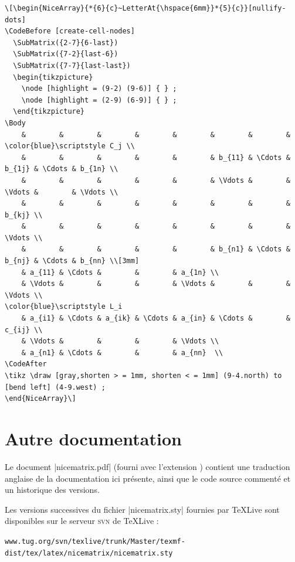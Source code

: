 \documentclass[dvipsnames]{article}%
\begin{document}
\begin{Verbatim}[formatcom = \small\color{gray}]
\[\begin{NiceArray}{*{6}{c}~LetterAt{\hspace{6mm}}*{5}{c}}[nullify-dots]
\CodeBefore [create-cell-nodes]
  \SubMatrix({2-7}{6-last})
  \SubMatrix({7-2}{last-6})
  \SubMatrix({7-7}{last-last})
  \begin{tikzpicture}
    \node [highlight = (9-2) (9-6)] { } ;
    \node [highlight = (2-9) (6-9)] { } ;
  \end{tikzpicture}
\Body
    &        &        &        &        &        &        &        & \color{blue}\scriptstyle C_j \\
    &        &        &        &        &        & b_{11} & \Cdots & b_{1j} & \Cdots & b_{1n} \\
    &        &        &        &        &        & \Vdots &        & \Vdots &        & \Vdots \\
    &        &        &        &        &        &        &        & b_{kj} \\
    &        &        &        &        &        &        &        & \Vdots \\
    &        &        &        &        &        & b_{n1} & \Cdots & b_{nj} & \Cdots & b_{nn} \\[3mm]
    & a_{11} & \Cdots &        &        & a_{1n} \\
    & \Vdots &        &        &        & \Vdots &        &        & \Vdots \\
\color{blue}\scriptstyle L_i
    & a_{i1} & \Cdots & a_{ik} & \Cdots & a_{in} & \Cdots &        & c_{ij} \\
    & \Vdots &        &        &        & \Vdots \\
    & a_{n1} & \Cdots &        &        & a_{nn}  \\
\CodeAfter
\tikz \draw [gray,shorten > = 1mm, shorten < = 1mm] (9-4.north) to [bend left] (4-9.west) ;
\end{NiceArray}\]
\end{Verbatim}



\section*{Autre documentation}

Le document |nicematrix.pdf| (fourni avec l'extension ) contient
une traduction anglaise de la documentation ici présente, ainsi que le code
source commenté et un historique des versions.

\medskip
Les versions successives du fichier |nicematrix.sty| fournies par
TeXLive sont disponibles sur le serveur \textsc{svn} de TeXLive :

\smallskip
{
\small
\nolinkurl{www.tug.org/svn/texlive/trunk/Master/texmf-dist/tex/latex/nicematrix/nicematrix.sty}
}
\end{document}
